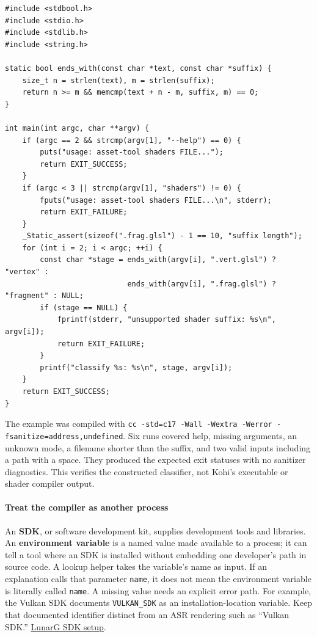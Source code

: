 \begin{verbatim}
#include <stdbool.h>
#include <stdio.h>
#include <stdlib.h>
#include <string.h>

static bool ends_with(const char *text, const char *suffix) {
    size_t n = strlen(text), m = strlen(suffix);
    return n >= m && memcmp(text + n - m, suffix, m) == 0;
}

int main(int argc, char **argv) {
    if (argc == 2 && strcmp(argv[1], "--help") == 0) {
        puts("usage: asset-tool shaders FILE...");
        return EXIT_SUCCESS;
    }
    if (argc < 3 || strcmp(argv[1], "shaders") != 0) {
        fputs("usage: asset-tool shaders FILE...\n", stderr);
        return EXIT_FAILURE;
    }
    _Static_assert(sizeof(".frag.glsl") - 1 == 10, "suffix length");
    for (int i = 2; i < argc; ++i) {
        const char *stage = ends_with(argv[i], ".vert.glsl") ? "vertex" :
                            ends_with(argv[i], ".frag.glsl") ? "fragment" : NULL;
        if (stage == NULL) {
            fprintf(stderr, "unsupported shader suffix: %s\n", argv[i]);
            return EXIT_FAILURE;
        }
        printf("classify %s: %s\n", stage, argv[i]);
    }
    return EXIT_SUCCESS;
}
\end{verbatim}

The example was compiled with \texttt{cc\ -std=c17\ -Wall\ -Wextra\ -Werror\ -fsanitize=address,undefined}. Six runs covered help, missing arguments, an unknown mode, a filename shorter than the suffix, and two valid inputs including a path with a space. They produced the expected exit statuses with no sanitizer diagnostics. This verifies the constructed classifier, not Kohi's executable or shader compiler output.

\paragraph{Treat the compiler as another process}\label{05-engine-i-ch013-treat-the-compiler-as-another-process}

An \textbf{SDK}, or software development kit, supplies development tools and libraries. An \textbf{environment variable} is a named value made available to a process; it can tell a tool where an SDK is installed without embedding one developer's path in source code. A lookup helper takes the variable's name as input. If an explanation calls that parameter \texttt{name}, it does not mean the environment variable is literally called \texttt{name}. A missing value needs an explicit error path. For example, the Vulkan SDK documents \texttt{VULKAN\_SDK} as an installation-location variable. Keep that documented identifier distinct from an ASR rendering such as ``Vulkan SDK.'' \href{https://vulkan.lunarg.com/doc/view/latest/linux/getting_started.html}{LunarG SDK setup}.

